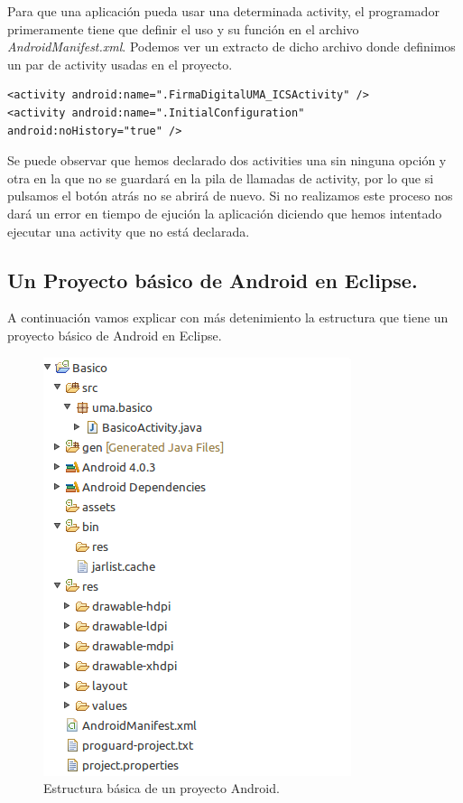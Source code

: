 \begin{itemize}
Para que una aplicación pueda usar una determinada activity, el programador primeramente tiene que definir el uso y su función en el archivo \textit{AndroidManifest.xml}. Podemos ver un extracto de dicho archivo donde definimos un par de activity usadas en el proyecto.
\newpage
\begin{lstlisting}[style=XML]
<activity android:name=".FirmaDigitalUMA_ICSActivity" />
<activity android:name=".InitialConfiguration" android:noHistory="true" />
\end{lstlisting}

Se puede observar que hemos declarado dos activities una sin ninguna opción y otra en la que no se guardará en la pila de llamadas de activity, por lo que si pulsamos el botón atrás no se abrirá de nuevo. Si no realizamos este proceso nos dará un error en tiempo de ejución la aplicación diciendo que hemos intentado ejecutar una activity que no está declarada.

\subsection{Un Proyecto básico de Android en Eclipse.}\label{cap:proyectoBasico}

A continuación vamos explicar con más detenimiento la estructura que tiene un proyecto básico de Android en Eclipse.

\begin{figure}
  \centering
    \includegraphics[scale=1]{./Android/imagenes/estructuraBasicaAndroid.png}
  \caption{Estructura básica de un proyecto Android.}
  \label{fig:estructuraBasicaAndroid}
\end{figure}


\end{itemize}
